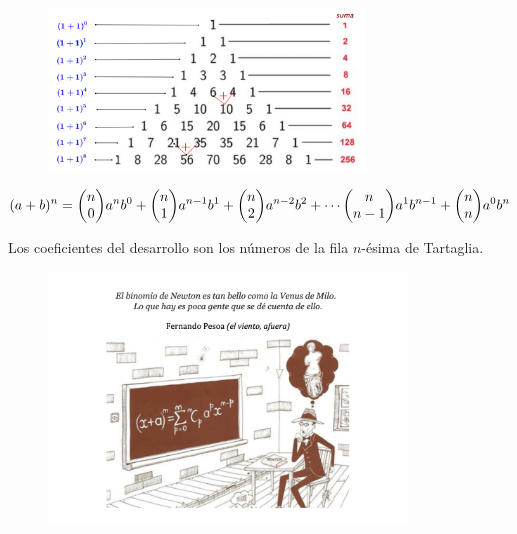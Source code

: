 \begin{figure}[H]
	\centering
	\includegraphics[width=0.75\textwidth]{img-reales/reales15.png}
	\end{figure}


\begin{theorem}

$$(a+b)^n  = \mqty(n\\0)a^nb^0+\mqty(n\\1)a^{n-1}b^1+\mqty(n\\2)a^{n-2}b^2+ \cdots \mqty(n\\n-1)a^1b^{n-1}+\mqty(n\\n)a^0b^n $$

\vspace{2mm} Los coeficientes del desarrollo son los números de la fila $n$-ésima de Tartaglia.
	 
\end{theorem}




\begin{figure}[H]
	\centering
	\includegraphics[width=0.85\textwidth]{img-reales/reales16.png}
	\end{figure}

